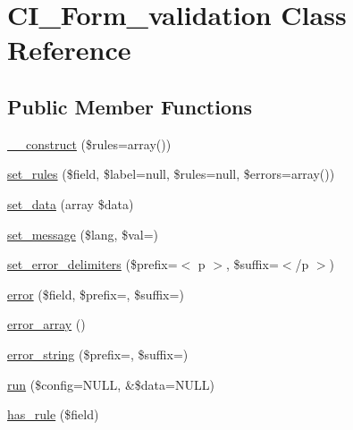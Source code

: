 \hypertarget{class_c_i___form__validation}{}\section{C\+I\+\_\+\+Form\+\_\+validation Class Reference}
\label{class_c_i___form__validation}
\subsection*{Public Member Functions}
\begin{DoxyCompactItemize}
\item 
\mbox{\hyperlink{class_c_i___form__validation_ac7224a1f92da249b312d1400c459ba83}{\+\_\+\+\_\+construct}} (\$rules=array())
\item 
\mbox{\hyperlink{class_c_i___form__validation_a22c123bdb5c222fc9884f0d48bc8e74d}{set\+\_\+rules}} (\$field, \$label=null, \$rules=null, \$errors=array())
\item 
\mbox{\hyperlink{class_c_i___form__validation_af211c000380b8b345c6eb102cb5ca453}{set\+\_\+data}} (array \$data)
\item 
\mbox{\hyperlink{class_c_i___form__validation_a5a0dc4d3aef1f228155320a1d5275895}{set\+\_\+message}} (\$lang, \$val=\textquotesingle{}\textquotesingle{})
\item 
\mbox{\hyperlink{class_c_i___form__validation_ac45ddc321a1c1e5d5aad6e11f1f29b9c}{set\+\_\+error\+\_\+delimiters}} (\$prefix=\textquotesingle{}$<$ p $>$\textquotesingle{}, \$suffix=\textquotesingle{}$<$/p $>$\textquotesingle{})
\item 
\mbox{\hyperlink{class_c_i___form__validation_ae249cb0a67da61052921cf2880876cc1}{error}} (\$field, \$prefix=\textquotesingle{}\textquotesingle{}, \$suffix=\textquotesingle{}\textquotesingle{})
\item 
\mbox{\hyperlink{class_c_i___form__validation_a477a3b8cbc925367d5b6880c48a9b42a}{error\+\_\+array}} ()
\item 
\mbox{\hyperlink{class_c_i___form__validation_a63271bfb23c2963bed80f44fe9c27b09}{error\+\_\+string}} (\$prefix=\textquotesingle{}\textquotesingle{}, \$suffix=\textquotesingle{}\textquotesingle{})
\item 
\mbox{\hyperlink{class_c_i___form__validation_a4177ebb7a334bdd8df26239e0192b962}{run}} (\$config=N\+U\+LL, \&\$data=N\+U\+LL)
\item 
\mbox{\hyperlink{class_c_i___form__validation_aaf0ef71d3e9ac390f52441f27e4b7786}{has\+\_\+rule}} (\$field)

\end{DoxyCompactItemize}

